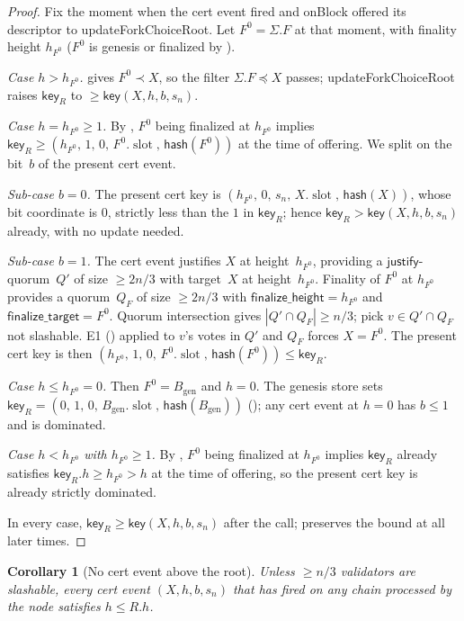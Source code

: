 \ifx\litemode\undefined\documentclass{article}\fi
\newcommand{\genesis}{\ensuremath{B_{\mathrm{gen}}}}
\newcommand{\slot}[0]{\ensuremath{\operatorname{\mathrm{slot}}}}
\newcommand{\just}{\ensuremath{\mathsf{justify}}\xspace}
\newcommand{\finalizeHeight}{\mathsf{finalize\_height}}
\newcommand{\finalizeTarget}{\mathsf{finalize\_target}}
\newcommand{\hash}{\mathsf{hash}}
\newcommand{\key}{\mathsf{key}}
\newcommand{\onBlock}{\textsf{onBlock}\xspace}
\newcommand{\updateForkChoiceRoot}{\textsf{updateForkChoiceRoot}\xspace}
\theoremstyle{plain}
\newtheorem{corollary}{Corollary}
\theoremstyle{definition}
\theoremstyle{remark}
\begin{document}
\begin{proof}
Fix the moment when the cert event fired and \onBlock offered its descriptor to \updateForkChoiceRoot. Let $F^0 = \Sigma.F$ at that moment, with finality height $h_{F^0}$ ($F^0$ is genesis or finalized by ).

\emph{Case $h > h_{F^0}$.}  gives $F^0 \prec X$, so the filter $\Sigma.F \preceq X$ passes; \updateForkChoiceRoot raises $\key_R$ to $\geq \key(X, h, b, s_n)$.

\emph{Case $h = h_{F^0} \geq 1$.}
By , $F^0$ being finalized at $h_{F^0}$ implies $\key_R \geq (h_{F^0},\, 1,\, 0,\, F^0.\slot,\, \hash(F^0))$ at the time of offering. We split on the bit~$b$ of the present cert event.

\emph{Sub-case $b = 0$.} The present cert key is $(h_{F^0},\, 0,\, s_n,\, X.\slot,\, \hash(X))$, whose bit coordinate is $0$, strictly less than the $1$ in $\key_R$; hence $\key_R > \key(X, h, b, s_n)$ already, with no update needed.

\emph{Sub-case $b = 1$.} The cert event justifies $X$ at height~$h_{F^0}$, providing a \just-quorum~$Q'$ of size $\geq 2n/3$ with target~$X$ at height~$h_{F^0}$. Finality of $F^0$ at $h_{F^0}$ provides a quorum~$Q_F$ of size $\geq 2n/3$ with $\finalizeHeight = h_{F^0}$ and $\finalizeTarget = F^0$. Quorum intersection gives $|Q' \cap Q_F| \geq n/3$; pick $v \in Q' \cap Q_F$ not slashable. E1 () applied to $v$'s votes in $Q'$ and $Q_F$ forces $X = F^0$. The present cert key is then $(h_{F^0},\, 1,\, 0,\, F^0.\slot,\, \hash(F^0)) \leq \key_R$.

\emph{Case $h \leq h_{F^0} = 0$.} Then $F^0 = \genesis$ and $h = 0$. The genesis store sets $\key_R = (0,\, 1,\, 0,\, \genesis.\slot,\, \hash(\genesis))$ (); any cert event at $h = 0$ has $b \leq 1$ and is dominated.

\emph{Case $h < h_{F^0}$ with $h_{F^0} \geq 1$.} By , $F^0$ being finalized at $h_{F^0}$ implies $\key_R$ already satisfies $\key_R.h \geq h_{F^0} > h$ at the time of offering, so the present cert key is already strictly dominated.

In every case, $\key_R \geq \key(X, h, b, s_n)$ after the call;  preserves the bound at all later times.
\end{proof}

\begin{corollary}[No cert event above the root]\label{rev:cor:no-high-cn}
Unless $\geq n/3$ validators are slashable, every cert event $(X, h, b, s_n)$ that has fired on any chain processed by the node satisfies $h \leq R.h$.
\end{corollary}
\end{document}
